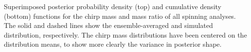 \label{fig:mass_pdfs} Superimposed posterior probability density (top) and cumulative density (bottom) functions for the chirp mass and mass ratio of all spinning analyses.  The solid and dashed lines show the ensemble-averaged and simulated distribution, respectively.  The chirp mass distributions have been centered on the distribution means, to show more clearly the variance in posterior shape.